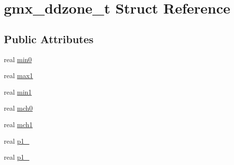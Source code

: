 \hypertarget{structgmx__ddzone__t}{\section{gmx\-\_\-ddzone\-\_\-t \-Struct \-Reference}
\label{structgmx__ddzone__t}
}
\subsection*{\-Public \-Attributes}
\begin{DoxyCompactItemize}
\item 
real \hyperlink{structgmx__ddzone__t_a0cb27e12d6358e4b5def529ef3584c32}{min0}
\item 
real \hyperlink{structgmx__ddzone__t_a21fec24a423a579f68c96784cd9ed021}{max1}
\item 
real \hyperlink{structgmx__ddzone__t_a0ed2cb1e7a546672318dddb5eef35e65}{min1}
\item 
real \hyperlink{structgmx__ddzone__t_af10e3c9a351dcb4a7a706d7ae1289a0d}{mch0}
\item 
real \hyperlink{structgmx__ddzone__t_ac64222dda1caa291213bdf1eb18cf3c6}{mch1}
\item 
real \hyperlink{structgmx__ddzone__t_a497638cb47e921b32a5bb9c9adba98ff}{p1\-\_}
\item 
real \hyperlink{structgmx__ddzone__t_a6889da4eefb96b9c303a24382354d104}{p1\-\_}
\end{DoxyCompactItemize}


